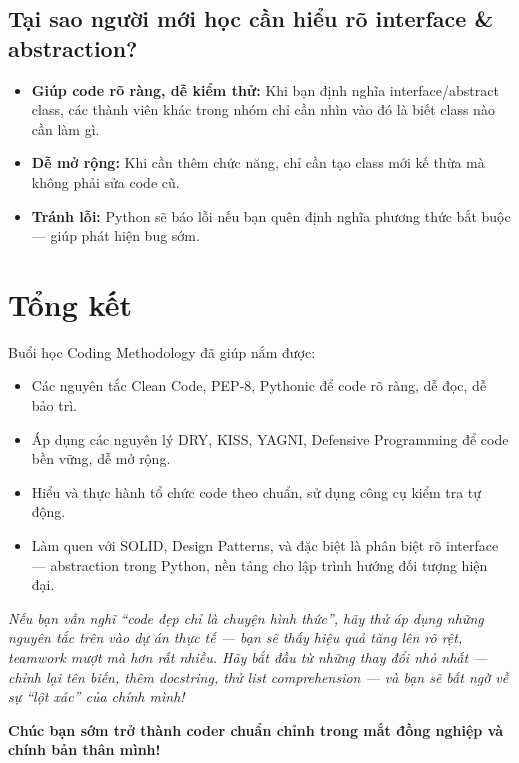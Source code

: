 \subsection{Tại sao người mới học cần hiểu rõ interface \& abstraction?}
\begin{itemize}
    \item \textbf{Giúp code rõ ràng, dễ kiểm thử:} Khi bạn định nghĩa interface/abstract class, các thành viên khác trong nhóm chỉ cần nhìn vào đó là biết class nào cần làm gì.
    \item \textbf{Dễ mở rộng:} Khi cần thêm chức năng, chỉ cần tạo class mới kế thừa mà không phải sửa code cũ.
    \item \textbf{Tránh lỗi:} Python sẽ báo lỗi nếu bạn quên định nghĩa phương thức bắt buộc --- giúp phát hiện bug sớm.
\end{itemize}

\section{Tổng kết}
Buổi học Coding Methodology đã giúp nắm được:
\begin{itemize}
    \item Các nguyên tắc Clean Code, PEP-8, Pythonic để code rõ ràng, dễ đọc, dễ bảo trì.
    \item Áp dụng các nguyên lý DRY, KISS, YAGNI, Defensive Programming để code bền vững, dễ mở rộng.
    \item Hiểu và thực hành tổ chức code theo chuẩn, sử dụng công cụ kiểm tra tự động.
    \item Làm quen với SOLID, Design Patterns, và đặc biệt là phân biệt rõ interface --- abstraction trong Python, nền tảng cho lập trình hướng đối tượng hiện đại.
\end{itemize}

\vspace{1em}
\textit{Nếu bạn vẫn nghĩ ``code đẹp chỉ là chuyện hình thức'', hãy thử áp dụng những nguyên tắc trên vào dự án thực tế --- bạn sẽ thấy hiệu quả tăng lên rõ rệt, teamwork mượt mà hơn rất nhiều. Hãy bắt đầu từ những thay đổi nhỏ nhất --- chỉnh lại tên biến, thêm docstring, thử list comprehension --- và bạn sẽ bất ngờ về sự ``lột xác'' của chính mình!}

\vspace{1em}
\textbf{Chúc bạn sớm trở thành coder chuẩn chỉnh trong mắt đồng nghiệp và chính bản thân mình!}
